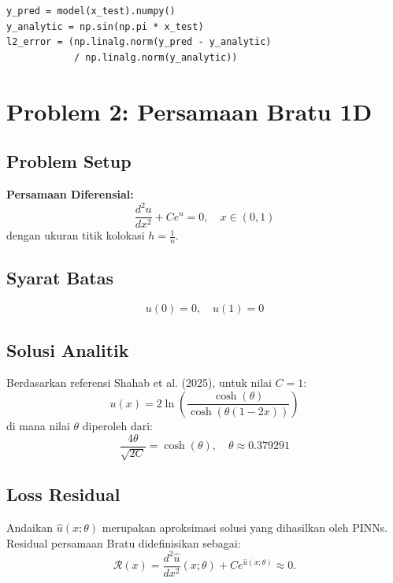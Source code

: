 \documentclass[12pt, letterpaper]{article}
\begin{document}
\begin{lstlisting}[caption={Evaluasi solusi Poisson}]
y_pred = model(x_test).numpy()
y_analytic = np.sin(np.pi * x_test)
l2_error = (np.linalg.norm(y_pred - y_analytic)
            / np.linalg.norm(y_analytic))
\end{lstlisting}

\section{Problem 2: Persamaan Bratu 1D}

\subsection{Problem Setup}

\textbf{Persamaan Diferensial:}
\begin{equation}
    \frac{d^2 u}{d x^2} + C e^{u} = 0, \quad x \in (0, 1)
\end{equation}
dengan ukuran titik kolokasi $h = \frac{1}{n}$.

\subsection{Syarat Batas}
\begin{equation}
    u(0) = 0, \quad u(1) = 0
\end{equation}

\subsection{Solusi Analitik}

Berdasarkan referensi Shahab et al. (2025), untuk nilai $C = 1$:
\begin{equation}
    u(x) = 2 \ln\!\left( \frac{\cosh(\theta)}{\cosh(\theta(1 - 2x))} \right)
\end{equation}
di mana nilai $\theta$ diperoleh dari:
\begin{equation}
    \frac{4\theta}{\sqrt{2C}} = \cosh(\theta), \quad \theta \approx 0.379291
\end{equation}

\subsection{Loss Residual}

Andaikan $\hat{u}(x;\theta)$ merupakan aproksimasi solusi yang dihasilkan oleh
PINNs. Residual persamaan Bratu didefinisikan sebagai:
\begin{equation}
    \mathcal{R}(x)
    =
    \frac{d^2 \hat{u}}{d x^2}(x;\theta)
    +
    C e^{\hat{u}(x;\theta)}
    \approx 0.
\end{equation}
\end{document}
